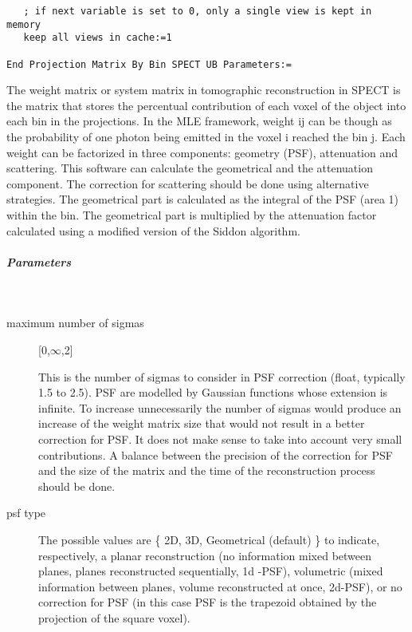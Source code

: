\documentclass{article}
\newcommand{\subsubsubsubsection}[1]{\subparagraph{#1} \mbox{} \\}
\begin{document}
{{\begin{verbatim}
   ; if next variable is set to 0, only a single view is kept in memory
   keep all views in cache:=1

End Projection Matrix By Bin SPECT UB Parameters:=
\end{verbatim}

The weight matrix or system matrix in tomographic reconstruction in SPECT is the matrix that stores the
percentual contribution of each voxel of the object into each bin in the projections. In the MLE
framework, weight ij can be though as the probability of one photon being emitted in the voxel i reached
the bin j. Each weight can be factorized in three components: geometry (PSF), attenuation and scattering.
This software can calculate the geometrical and the attenuation component. The correction for scattering
should be done using alternative strategies. The geometrical part is calculated as the integral of the
PSF (area 1) within the bin. The geometrical part is multiplied by the attenuation factor calculated
using a modified version of the Siddon algorithm.  

{ \subsubsubsubsection{Parameters}
}
\begin{description}
\item[maximum number of sigmas] [0,$\infty$,2{]}

  This is the number of sigmas to consider in PSF correction (float, typically 1.5 to 2.5). PSF are
  modelled by Gaussian functions whose extension is infinite. To increase unnecessarily the number of
  sigmas would produce an increase of the weight matrix size that would not result in a better correction
  for PSF. It does not make sense to take into account very small contributions. A balance between the
  precision of the correction for PSF and the size of the matrix and the time of the reconstruction
  process should be done.

%	

\item[psf type] 
 
  The possible values are \{ 2D, 3D, Geometrical (default) \} to indicate, respectively, a planar
  reconstruction (no information mixed between planes, planes reconstructed sequentially, 1d -PSF),
  volumetric (mixed information between planes, volume reconstructed at once, 2d-PSF), or no correction
  for PSF (in this case PSF is the trapezoid obtained by the projection of the square voxel).


\end{description}}}
\end{document}

